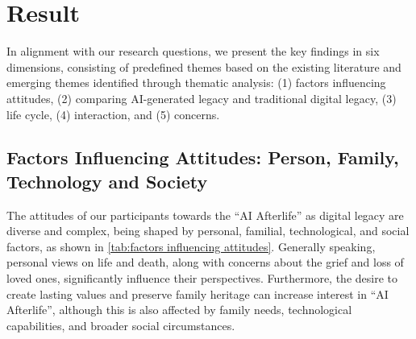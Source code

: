 \section{Result} \label{result}
In alignment with our research questions, we present the key findings in six dimensions, consisting of predefined themes based on the existing literature and emerging themes identified through thematic analysis: (1) factors influencing attitudes, (2) comparing AI-generated legacy and traditional digital legacy, (3) life cycle, (4) interaction, and (5) concerns. 

\subsection{Factors Influencing Attitudes: Person, Family, Technology and Society}\label{attitudes factors}

The attitudes of our participants towards the ``AI Afterlife'' as digital legacy are diverse and complex, being shaped by personal, familial, technological, and social factors, as shown in \autoref{tab:factors influencing attitudes}.
Generally speaking, personal views on life and death, along with concerns about the grief and loss of loved ones, significantly influence their perspectives. Furthermore, the desire to create lasting values and preserve family heritage can increase interest in ``AI Afterlife'', although this is also affected by family needs, technological capabilities, and broader social circumstances.

